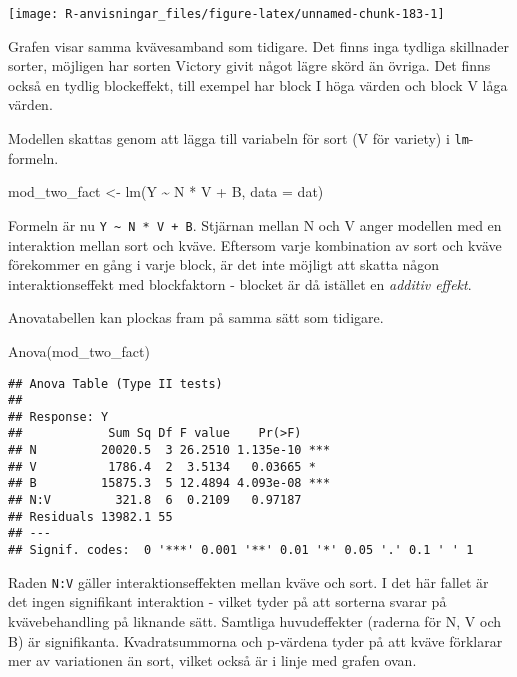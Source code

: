 \documentclass[
]{book}
\newenvironment{Shaded}{\begin{snugshade}}{\end{snugshade}}
\newcommand{\AttributeTok}[1]{\textcolor[rgb]{0.77,0.63,0.00}{#1}}
\newcommand{\FunctionTok}[1]{\textcolor[rgb]{0.00,0.00,0.00}{#1}}
\newcommand{\NormalTok}[1]{#1}
\newcommand{\OtherTok}[1]{\textcolor[rgb]{0.56,0.35,0.01}{#1}}
\newcommand{\SpecialCharTok}[1]{\textcolor[rgb]{0.00,0.00,0.00}{#1}}
\theoremstyle{definition}
\theoremstyle{definition}
\theoremstyle{definition}
\theoremstyle{definition}
\theoremstyle{remark}
\begin{document}
\begin{center}\texttt{[image: R-anvisningar\_files/figure-latex/unnamed-chunk-183-1]} \end{center}

Grafen visar samma kvävesamband som tidigare. Det finns inga tydliga skillnader sorter, möjligen har sorten Victory givit något lägre skörd än övriga. Det finns också en tydlig blockeffekt, till exempel har block I höga värden och block V låga värden.

Modellen skattas genom att lägga till variabeln för sort (V för variety) i \texttt{lm}-formeln.

\begin{Shaded}
\begin{Highlighting}[]
\NormalTok{mod\_two\_fact }\OtherTok{\textless{}{-}} \FunctionTok{lm}\NormalTok{(Y }\SpecialCharTok{\textasciitilde{}}\NormalTok{ N }\SpecialCharTok{*}\NormalTok{ V }\SpecialCharTok{+}\NormalTok{ B, }\AttributeTok{data =}\NormalTok{ dat)}
\end{Highlighting}
\end{Shaded}

Formeln är nu \texttt{Y\ \textasciitilde{}\ N\ *\ V\ +\ B}. Stjärnan mellan N och V anger modellen med en interaktion mellan sort och kväve. Eftersom varje kombination av sort och kväve förekommer en gång i varje block, är det inte möjligt att skatta någon interaktionseffekt med blockfaktorn - blocket är då istället en \emph{additiv effekt}.

Anovatabellen kan plockas fram på samma sätt som tidigare.

\begin{Shaded}
\begin{Highlighting}[]
\FunctionTok{Anova}\NormalTok{(mod\_two\_fact)}
\end{Highlighting}
\end{Shaded}

\begin{verbatim}
## Anova Table (Type II tests)
## 
## Response: Y
##            Sum Sq Df F value    Pr(>F)    
## N         20020.5  3 26.2510 1.135e-10 ***
## V          1786.4  2  3.5134   0.03665 *  
## B         15875.3  5 12.4894 4.093e-08 ***
## N:V         321.8  6  0.2109   0.97187    
## Residuals 13982.1 55                      
## ---
## Signif. codes:  0 '***' 0.001 '**' 0.01 '*' 0.05 '.' 0.1 ' ' 1
\end{verbatim}

Raden \texttt{N:V} gäller interaktionseffekten mellan kväve och sort. I det här fallet är det ingen signifikant interaktion - vilket tyder på att sorterna svarar på kvävebehandling på liknande sätt. Samtliga huvudeffekter (raderna för N, V och B) är signifikanta. Kvadratsummorna och p-värdena tyder på att kväve förklarar mer av variationen än sort, vilket också är i linje med grafen ovan.
\end{document}
